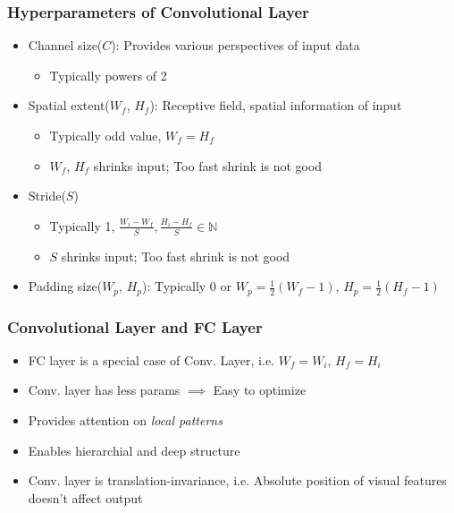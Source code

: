 \subsubsection*{Hyperparameters of Convolutional Layer}
\begin{itemize}
    \item Channel size($C$): Provides various perspectives of input data
    \begin{itemize}
        \item Typically powers of 2
    \end{itemize}
    \item Spatial extent($W_f$, $H_f$): Receptive field, spatial information of input
    \begin{itemize}
        \item Typically odd value, $W_f=H_f$
        \item $W_f$, $H_f$ shrinks input; Too fast shrink is not good
    \end{itemize}
    \item Stride($S$)
    \begin{itemize}
        \item Typically 1, $\frac{W_i-W_f}{S},\frac{H_i-H_f}{S}\in\mathbb{N}$
        \item $S$ shrinks input; Too fast shrink is not good
    \end{itemize}
    \item Padding size($W_p$, $H_p$): Typically 0 or $W_p=\frac{1}{2}(W_f-1)$, $H_p=\frac{1}{2}(H_f-1)$
\end{itemize}

\subsubsection*{Convolutional Layer and FC Layer}
\begin{itemize}
    \item FC layer is a special case of Conv. Layer, i.e. $W_f=W_i$, $H_f=H_i$
    \item Conv. layer has less params $\implies$ Easy to optimize
    \item Provides attention on \textit{local patterns}
    \item Enables hierarchial and deep structure
    \item Conv. layer is translation-invariance, i.e. Absolute position of visual features doesn't affect output
\end{itemize}

